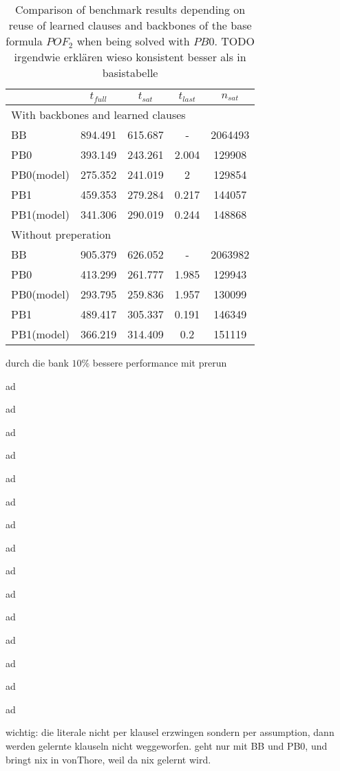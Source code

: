 \begin{wraptable}{r}{8cm}
\begin{tabular}{l | c c c c}
 & $t_{full}$ & $t_{sat}$ & $t_{last}$& $n_{sat}$\\
\hline
\multicolumn{5}{l}{With backbones and learned clauses}\\
BB & 894.491 & 615.687 & - & 2064493\\
PB0 & 393.149 & 243.261 & 2.004 & 129908\\
PB0(model) & 275.352 & 241.019 & 2 & 129854\\
PB1 & 459.353 & 279.284 & 0.217 & 144057\\
PB1(model) & 341.306 & 290.019 & 0.244 & 148868\\
\hline 
\multicolumn{3}{l}{Without preperation}\\
BB & 905.379 & 626.052 & - & 2063982\\
PB0 & 413.299 & 261.777 & 1.985 & 129943\\
PB0(model) & 293.795 & 259.836 & 1.957 & 130099\\
PB1 & 489.417 & 305.337 & 0.191 & 146349\\
PB1(model) & 366.219 & 314.409 & 0.2 & 151119\\
\hline
\end{tabular}
\caption{Comparison of benchmark results depending on reuse of learned clauses and backbones of the base formula $POF_2$ when being solved with $PB0$. TODO irgendwie erklären wieso konsistent besser als in basistabelle}
\end{wraptable}

durch die bank $10\%$ bessere performance mit prerun

ad

ad

ad

ad

ad

ad

ad

ad

ad

ad

ad

ad

ad

ad

ad

wichtig: die literale nicht per klausel erzwingen sondern per assumption, dann werden gelernte klauseln nicht weggeworfen. geht nur mit BB und PB0, und bringt nix in vonThore, weil da nix gelernt wird.

